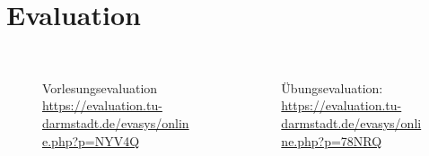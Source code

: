 \section{Evaluation}
\begin{frame}
    \slidehead
    \begin{columns}
        \begin{column}{6cm}
            \vspace{-0.5cm}
            \begin{figure}
                \centering
                \\  \sffamily \tiny Vorlesungsevaluation \href{https://evaluation.tu-darmstadt.de/evasys/online.php?p=NYV4Q}{https://evaluation.tu-darmstadt.de/evasys/online.php?p=NYV4Q}
            \end{figure}
        \end{column}
        \begin{column}{6cm}
            \vspace{-0.5cm}
            \begin{figure}
                \centering
                \\  \sffamily \tiny Übungsevaluation: \href{https://evaluation.tu-darmstadt.de/evasys/online.php?p=78NRQ}{https://evaluation.tu-darmstadt.de/evasys/online.php?p=78NRQ}
            \end{figure}
        \end{column}
    \end{columns}
\end{frame}




